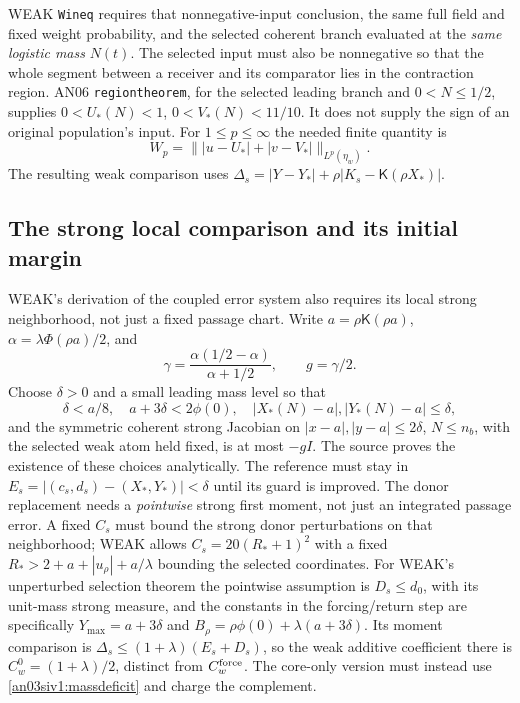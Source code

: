 \documentclass[11pt]{article}
\numberwithin{equation}{section}
\theoremstyle{remark}\newtheorem{remark}[proposition]{Remark}
\newcommand{\Kfun}{\mathsf K}\newcommand{\Ffun}{\mathsf F}
\begin{document}
WEAK \texttt{Wineq} requires that nonnegative-input conclusion,
the same full field and fixed weight probability, and the selected
coherent branch evaluated at the \emph{same logistic mass} $N(t)$.
The selected input must also be nonnegative so that the whole segment
between a receiver and its comparator lies in the contraction region.
AN06 \texttt{regiontheorem}, for the selected leading branch and
$0<N\le1/2$, supplies $0<U_*(N)<1$, $0<V_*(N)<11/10$.
It does not supply the sign of an original population's input.
For $1\le p\le\infty$ the needed finite quantity is
\[
 W_p=\big\||u-U_*|+|v-V_*|\big\|_{L^p(\eta_w)}.
\]
The resulting weak comparison uses
$\Delta_s=|Y-Y_*|+\rho|K_s-\Kfun(\rho X_*)|$.

\subsection*{The strong local comparison and its initial margin}
WEAK's derivation of the coupled error system also requires its local
strong neighborhood, not just a fixed passage chart. Write
$a=\rho\Kfun(\rho a)$, $\alpha=\lambda\Phi(\rho a)/2$, and
\[
 \gamma=\frac{\alpha(1/2-\alpha)}{\alpha+1/2},\qquad g=\gamma/2.
\]
Choose $\delta>0$ and a small leading mass level so that
\begin{equation}
 \delta<a/8,\quad a+3\delta<2\phi(0),\quad
 |X_*(N)-a|,|Y_*(N)-a|\le\delta,
 \label{an03siv1:localbox}
\end{equation}
and the symmetric coherent strong Jacobian on
$|x-a|,|y-a|\le2\delta$, $N\le n_b$, with the selected weak
atom held fixed, is at most $-gI$. The source proves the existence
of these choices analytically. The reference must stay in
$E_s=|(c_s,d_s)-(X_*,Y_*)|<\delta$ until its guard is improved.
The donor replacement needs a \emph{pointwise} strong first moment,
not just an integrated passage error. A fixed $C_s$ must bound the
strong donor perturbations on that neighborhood; WEAK allows
$C_s=20(R_*+1)^2$ with a fixed
$R_*>2+a+|u_\rho|+a/\lambda$ bounding the selected coordinates.
For WEAK's unperturbed selection theorem the pointwise assumption is
$D_s\le d_0$, with its unit-mass strong measure, and the constants in
the forcing/return step are specifically
$Y_{\max}=a+3\delta$ and
$B_\rho=\rho\phi(0)+\lambda(a+3\delta)$.
Its moment comparison is
$\Delta_s\le(1+\lambda)(E_s+D_s)$, so the weak additive coefficient
there is $C_w^0=(1+\lambda)/2$, distinct from
$C_w^{\rm force}$. The core-only version must instead use
\eqref{an03siv1:massdeficit} and charge the complement.
\end{document}
